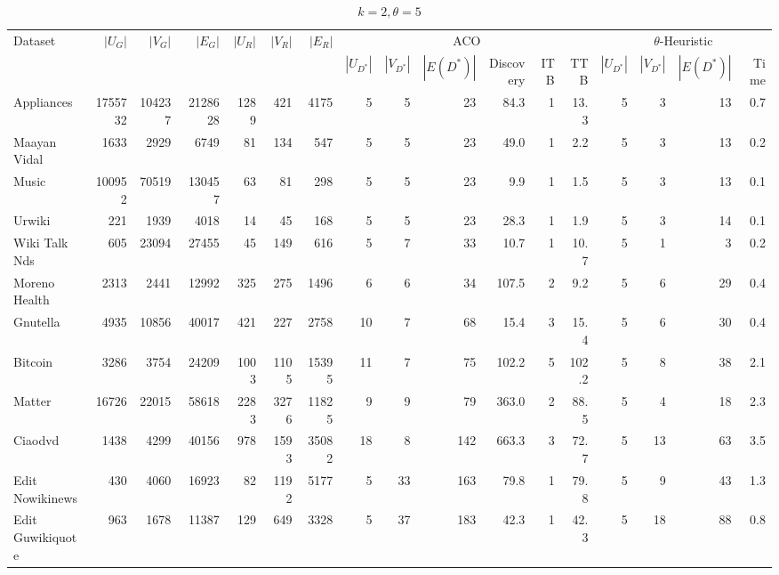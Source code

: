 \begin{landscape}
\begin{table}[htbp]
  \centering
  \caption{$k=2, \theta=5$}

  \centering
  \setlength{\tabcolsep}{3.5pt} %
  \begin{tabular}{l *{16}{r}} %
    \toprule
    Dataset & $|U_G|$ & $|V_G|$ & $|E_G|$ & $|U_R|$ & $|V_R|$ & $|E_R|$ & \multicolumn{6}{c}{ACO} & \multicolumn{4}{c}{$\theta$-Heuristic} \\
    \cmidrule(lr){8-13} \cmidrule(lr){14-17}
    & & & & & & & $|U_{D^*}|$ & $|V_{D^*}|$ & $|E(D^*)|$ & Discovery & ITB & TTB & $|U_{D^*}|$ & $|V_{D^*}|$ & $|E(D^*)|$ & Time \\
    \midrule
    Appliances & 1755732 & 104237 & 2128628 & 1289 & 421 & 4175 & 5 & 5 & 23 & 84.3 & 1 & 13.3 & 5 & 3 & 13 & 0.7 \\
    Maayan Vidal & 1633 & 2929 & 6749 & 81 & 134 & 547 & 5 & 5 & 23 & 49.0 & 1 & 2.2 & 5 & 3 & 13 & 0.2 \\
    Music & 100952 & 70519 & 130457 & 63 & 81 & 298 & 5 & 5 & 23 & 9.9 & 1 & 1.5 & 5 & 3 & 13 & 0.1 \\
    Urwiki & 221 & 1939 & 4018 & 14 & 45 & 168 & 5 & 5 & 23 & 28.3 & 1 & 1.9 & 5 & 3 & 14 & 0.1 \\
    Wiki Talk Nds & 605 & 23094 & 27455 & 45 & 149 & 616 & 5 & 7 & 33 & 10.7 & 1 & 10.7 & 5 & 1 & 3 & 0.2 \\
    Moreno Health & 2313 & 2441 & 12992 & 325 & 275 & 1496 & 6 & 6 & 34 & 107.5 & 2 & 9.2 & 5 & 6 & 29 & 0.4 \\
    Gnutella & 4935 & 10856 & 40017 & 421 & 227 & 2758 & 10 & 7 & 68 & 15.4 & 3 & 15.4 & 5 & 6 & 30 & 0.4 \\
    Bitcoin & 3286 & 3754 & 24209 & 1003 & 1105 & 15395 & 11 & 7 & 75 & 102.2 & 5 & 102.2 & 5 & 8 & 38 & 2.1 \\
    Matter & 16726 & 22015 & 58618 & 2283 & 3276 & 11825 & 9 & 9 & 79 & 363.0 & 2 & 88.5 & 5 & 4 & 18 & 2.3 \\
    Ciaodvd & 1438 & 4299 & 40156 & 978 & 1593 & 35082 & 18 & 8 & 142 & 663.3 & 3 & 72.7 & 5 & 13 & 63 & 3.5 \\
    Edit Nowikinews & 430 & 4060 & 16923 & 82 & 1192 & 5177 & 5 & 33 & 163 & 79.8 & 1 & 79.8 & 5 & 9 & 43 & 1.3 \\
    Edit Guwikiquote & 963 & 1678 & 11387 & 129 & 649 & 3328 & 5 & 37 & 183 & 42.3 & 1 & 42.3 & 5 & 18 & 88 & 0.8 \\

\end{tabular}
\end{table}
\end{landscape}
